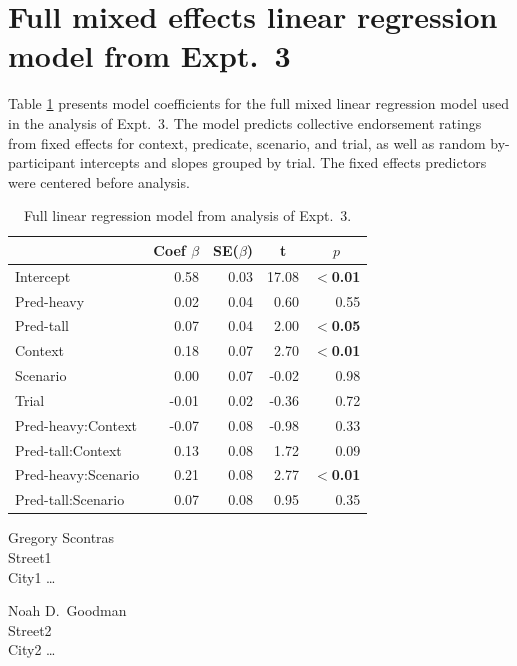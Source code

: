 \documentclass[linguex]{sp}
\begin{document}
\section{Full mixed effects linear regression model from Expt.~3}\label{expt3results}

Table \ref{expt3analysis} presents model coefficients for the full mixed linear regression model used in the analysis of Expt.~3. The model predicts collective endorsement ratings from fixed effects for context, predicate, scenario, and trial, as well as random by-participant intercepts and slopes grouped by trial. The fixed effects predictors were centered before analysis.

\begin{table}[htb] 
	\centering \caption{Full linear regression model from analysis of Expt.~3.} \label{expt3analysis}
\begin{tabular}{lrrrr}\toprule
	&	Coef $\beta$	&	SE($\beta$)	&	\multicolumn{1}{c}{ \textbf{t}}	&	\multicolumn{1}{c}{$p$}\\ \midrule
Intercept			& 	0.58	&	0.03	&	17.08&	\textbf{$<$0.01} \\
Pred-heavy		&	0.02	&   	0.04	&	0.60	&	0.55 \\
Pred-tall			&	0.07	&	0.04	&	2.00	&	\textbf{$<$0.05}\\
Context			&	0.18	&	0.07	&	2.70	&	\textbf{$<$0.01}\\
Scenario			& 	0.00	&	0.07	& 	-0.02	&	0.98 \\
Trial				&	-0.01	&	0.02  &	-0.36	&   0.72 \\
Pred-heavy:Context	&	-0.07	&	0.08	&	-0.98	&	0.33 \\
Pred-tall:Context	&	0.13	&	0.08	&	1.72	& {0.09} \\
Pred-heavy:Scenario	&	0.21	&	0.08	&	2.77	&	\textbf{$<$0.01} \\
Pred-tall:Scenario	&	0.07	&	0.08	&	0.95	& 0.35\\
\bottomrule
\end{tabular}
\end{table}


%


\begin{addresses}
	\begin{address}
		Gregory Scontras \\
		Street1 \\
		City1 \ldots \\
	\end{address}
	\begin{address}
		Noah D.~Goodman \\
		Street2 \\
		City2 \dots \\
		\email{author2@email}
	\end{address}
\end{addresses}
\end{document}
